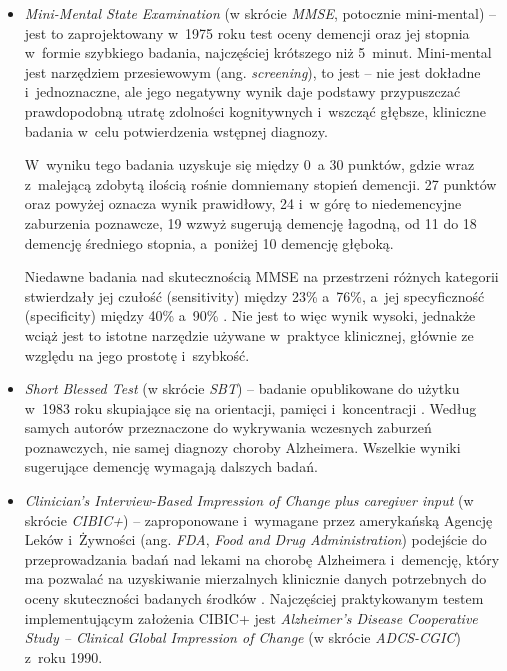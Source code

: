 {\begin{itemize}

  \item \emph{Mini-Mental State Examination} (w skrócie \emph{MMSE}, potocznie mini-mental) -- jest to zaprojektowany w~1975 roku test oceny demencji oraz jej stopnia w~formie szybkiego badania, najczęściej krótszego niż 5~minut.
        Mini-mental jest narzędziem przesiewowym (ang. \emph{screening}), to jest -- nie jest dokładne i~jednoznaczne, ale jego negatywny wynik daje podstawy przypuszczać prawdopodobną utratę zdolności kognitywnych i~wszcząć
        głębsze, kliniczne badania w~celu potwierdzenia wstępnej diagnozy.

        W~wyniku tego badania uzyskuje się między 0~a 30 punktów, gdzie wraz z~malejącą zdobytą ilością rośnie domniemany stopień demencji.
        27 punktów oraz powyżej oznacza wynik prawidłowy, 24 i~w górę to niedemencyjne zaburzenia poznawcze, 19 wzwyż sugerują demencję łagodną, od 11 do 18 demencję średniego stopnia, a~poniżej 10 demencję głęboką.

        Niedawne badania nad skutecznością MMSE na przestrzeni różnych kategorii stwierdzały jej czułość (sensitivity) między 23\% a~76\%, a~jej specyficzność (specificity) między 40\% a~90\% \cite{arevalo2015mini}.
        Nie jest to więc wynik wysoki, jednakże wciąż jest to istotne narzędzie używane w~praktyce klinicznej, głównie ze względu na jego prostotę i~szybkość.

  \item \emph{Short Blessed Test} (w skrócie \emph{SBT}) -- badanie opublikowane do użytku w~1983 roku skupiające się na orientacji, pamięci i~koncentracji \cite{katzman1983validation}.
        Według samych autorów przeznaczone do wykrywania wczesnych zaburzeń poznawczych, nie samej diagnozy choroby Alzheimera.
        Wszelkie wyniki sugerujące demencję wymagają dalszych badań.

  \item \emph{Clinician's Interview-Based Impression of Change plus caregiver input} (w skrócie \emph{CIBIC+}) -- zaproponowane i~wymagane przez amerykańską Agencję Leków i~Żywności (ang. \emph{FDA}, \emph{Food and Drug Administration}) podejście do przeprowadzania badań nad lekami na chorobę Alzheimera i~demencję, który ma pozwalać na uzyskiwanie mierzalnych klinicznie danych potrzebnych do oceny skuteczności badanych środków \cite{joffres2000qualitative}.
        Najczęściej praktykowanym testem implementującym założenia CIBIC+ jest \emph{Alzheimer's Disease Cooperative Study -- Clinical Global Impression of Change} (w skrócie \emph{ADCS-CGIC}) z~roku 1990.


\end{itemize}}
